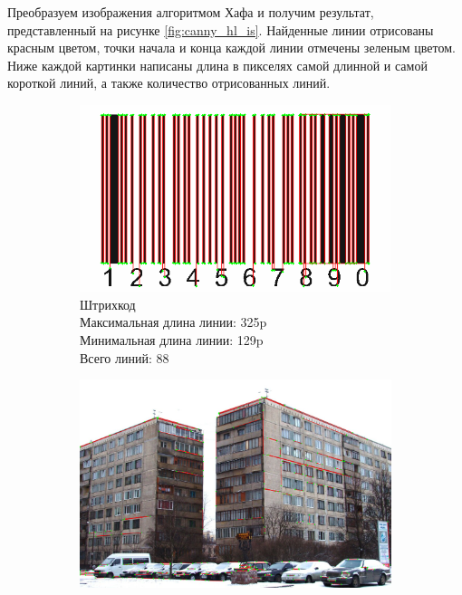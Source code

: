\documentclass[a4paper, 16pt]{article}
\begin{document}
    \noindent Преобразуем изображения алгоритмом Хафа и получим результат, представленный на рисунке \ref{fig:canny_hl_is}.
    Найденные линии отрисованы красным цветом, точки начала и конца каждой линии отмечены зеленым цветом.
    Ниже каждой картинки написаны длина в пикселях самой длинной и самой короткой линий, а также количество отрисованных линий.
    \begin{figure}[htbp]
        \centering
        \begin{subfigure}{0.3\textwidth}
            \centering
            \includegraphics[width=\linewidth]{canny_hl_i1.png}
            \caption{Штрихкод\\Максимальная длина линии: 325p\\Минимальная длина линии: 129p\\Всего линий: 88}
            \label{fig:canny_hl_i1}
        \end{subfigure}
        \hfill
        \begin{subfigure}{0.3\textwidth}
            \centering
            \includegraphics[width=\linewidth]{canny_hl_i2.png}

\end{subfigure}
\end{figure}
\end{document}
